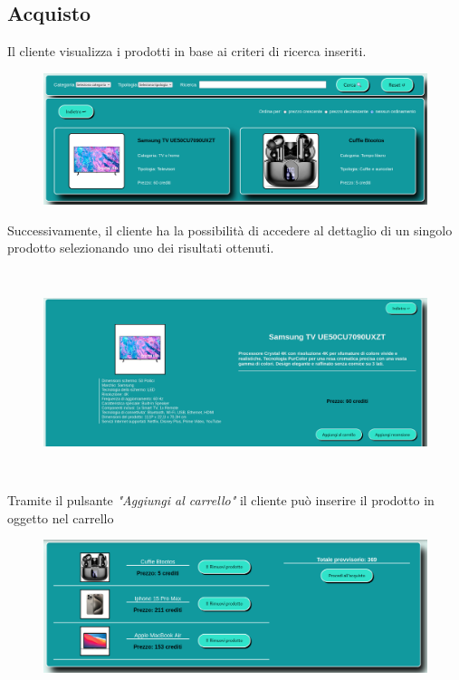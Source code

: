 \documentclass[a4paper, 14pt]{article}
\begin{document}
\begin{flushleft}
				
			\subsection{Acquisto}
				Il cliente visualizza i prodotti in base ai criteri di ricerca inseriti.
				\begin{figure}[H]
					\includegraphics[width=\textwidth, frame=2pt]{"screenCatalogo.png"}	
				\end{figure}
				Successivamente, il cliente ha la possibilità di accedere al dettaglio di un singolo prodotto selezionando
				uno dei risultati ottenuti.
				\begin{figure}[H]
					\centering
					\includegraphics[height=6cm, frame=2pt]{"screenProdotto.png"}	
				\end{figure}
				Tramite il pulsante \textit{"Aggiungi al carrello"} il cliente può inserire il prodotto in oggetto nel carrello
				\begin{figure}[H]
					\includegraphics[width=\textwidth, frame=2pt]{"screenCarrello.png"}	
				\end{figure}

\end{flushleft}
\end{document}
